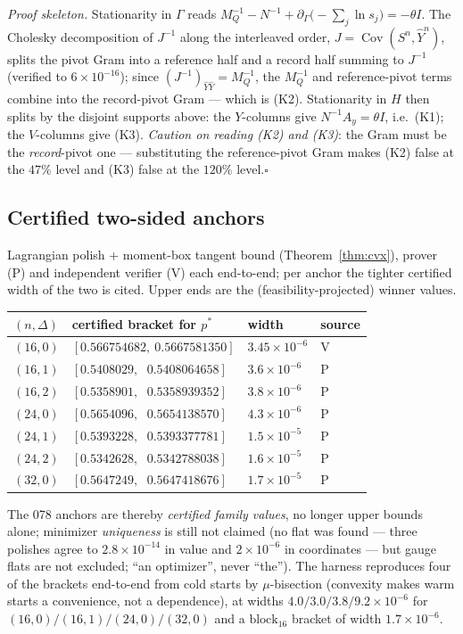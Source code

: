 \documentclass[11pt]{article}
\theoremstyle{definition}
\theoremstyle{remark}
\begin{document}
\noindent\emph{Proof skeleton.} Stationarity in $\Gamma$ reads
$M_Q^{-1}-N^{-1}+\partial_\Gamma\bigl(-\sum_j\ln s_j\bigr)=-\theta I$.
The Cholesky decomposition of $J^{-1}$ along the interleaved order,
$J=\operatorname{Cov}(S^n,\hat Y^n)$, splits the pivot Gram into a
reference half and a record half summing to $J^{-1}$ (verified to
$6\times10^{-16}$); since $(J^{-1})_{\hat Y\hat Y}=M_Q^{-1}$, the
$M_Q^{-1}$ and reference-pivot terms combine into the record-pivot Gram
--- which is (K2). Stationarity in $H$ then splits by the disjoint
supports above: the $Y$-columns give $N^{-1}A_y=\theta I$, i.e.\ (K1);
the $V$-columns give (K3). \emph{Caution on reading (K2) and (K3)}:
the Gram must be the \emph{record}-pivot one --- substituting the
reference-pivot Gram makes (K2) false at the $47\%$ level and (K3)
false at the $120\%$ level.\hfill$\square$

\subsection{Certified two-sided anchors}
\label{sec:anchors}
Lagrangian polish + moment-box tangent bound
(Theorem~\ref{thm:cvx}), prover (P) and independent verifier (V)
each end-to-end; per anchor the tighter certified width of the two
is cited. Upper ends are the (feasibility-projected) winner values.

\begin{center}
\begin{tabular}{llll}
$(n,\Delta)$ & certified bracket for $p^\ast$ & width & source\\
\hline
$(16,0)$ & $[0.566754682,\ 0.5667581350]$ & $3.45\times10^{-6}$ & V\\
$(16,1)$ & $[0.5408029,\ \ \,0.5408064658]$ & $3.6\times10^{-6}$ & P\\
$(16,2)$ & $[0.5358901,\ \ \,0.5358939352]$ & $3.8\times10^{-6}$ & P\\
$(24,0)$ & $[0.5654096,\ \ \,0.5654138570]$ & $4.3\times10^{-6}$ & P\\
$(24,1)$ & $[0.5393228,\ \ \,0.5393377781]$ & $1.5\times10^{-5}$ & P\\
$(24,2)$ & $[0.5342628,\ \ \,0.5342788038]$ & $1.6\times10^{-5}$ & P\\
$(32,0)$ & $[0.5647249,\ \ \,0.5647418676]$ & $1.7\times10^{-5}$ & P\\
\end{tabular}
\end{center}

\noindent The 078 anchors are thereby \emph{certified family
values}, no longer upper bounds alone; minimizer \emph{uniqueness}
is still not claimed (no flat was found --- three polishes agree to
$2.8\times10^{-14}$ in value and $2\times10^{-6}$ in coordinates ---
but gauge flats are not excluded; ``an optimizer'', never
``the''). The harness reproduces four of the brackets end-to-end
from cold starts by $\mu$-bisection (convexity makes warm starts a
convenience, not a dependence), at widths $4.0/3.0/3.8/9.2\times
10^{-6}$ for $(16,0)/(16,1)/(24,0)/(32,0)$ and a
$\mathrm{block}_{16}$ bracket of width $1.7\times10^{-6}$.
\end{document}
